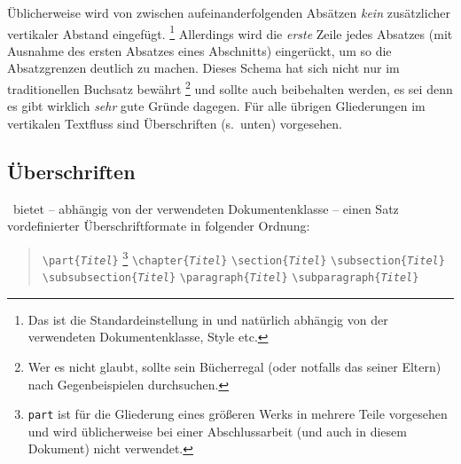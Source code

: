 Üblicherweise wird von {\latex} zwischen aufeinanderfolgenden Ab\-sätzen
\emph{kein} zusätzlicher vertikaler Abstand eingefügt.%
\footnote{Das ist die Standardeinstellung in {\latex} und natürlich abhängig
von der verwendeten Dokumentenklasse, Style etc.}
Allerdings wird die \emph{erste} Zeile jedes Absatzes (mit Ausnahme des
ersten Absatzes eines Abschnitts) eingerückt, um so die Absatzgrenzen
deutlich zu machen. Dieses Schema hat sich nicht nur im traditionellen
Buchsatz bewährt%
\footnote{Wer es nicht glaubt, sollte sein Bücherregal (oder notfalls das
seiner Eltern) nach Gegenbeispielen durchsuchen.}
und sollte auch beibehalten werden, es sei denn es gibt wirklich \emph{sehr}
gute Gründe dagegen. Für alle übrigen Gliederungen im vertikalen Textfluss
sind Überschriften (s.\ unten) vorgesehen.

\subsection{Überschriften}
\label{sec:ueberschriften}

\latex\ bietet -- abhängig von der verwendeten Dokumentenklasse -- einen Satz
vordefinierter Überschriftformate in folgender Ordnung:
%
\begin{quote}
    \verb!\part{!\texttt{\em Titel}\verb!}!%
    \footnote{\texttt{part} ist für die Gliederung eines
    größeren Werks in mehrere Teile vorgesehen und wird üblicherweise
    bei einer Abschlussarbeit (und auch in diesem Dokument) nicht
    verwendet.}
    \newline%
    \verb!\chapter{!\texttt{\em Titel}\verb!}! \newline%
    \verb!\section{!\texttt{\em Titel}\verb!}! \newline%
    \verb!\subsection{!\texttt{\em Titel}\verb!}! \newline%
    \verb!\subsubsection{!\texttt{\em Titel}\verb!}! \newline%
    \verb!\paragraph{!\texttt{\em Titel}\verb!}! \newline%
    \verb!\subparagraph{!\texttt{\em Titel}\verb!}!
\end{quote}
%

